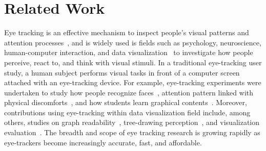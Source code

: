 \section{Related Work}
Eye tracking is an effective mechanism to inspect people's visual patterns and attention processes~\cite{jacob1991use}, and is widely used is fields such as psychology, neuroscience, human-computer interaction, and data visualization~\cite{duchowski2002breadth} to investigate how people perceive, react to, and think with visual stimuli. In a traditional eye-tracking user study, a human subject performs visual tasks in front of a computer screen attached with an eye-tracking device. For example, eye-tracking experiments were undertaken to study how people recognize faces~\cite{guo2014perceiving}, attention pattern linked with physical discomforts~\cite{vervoort2013attentional}, and how students learn graphical contents~\cite{mayer2010unique}. Moreover, contributions using eye-tracking within data visualization field include, among others, studies on graph readability~\cite{pohl2009comparing, huang2008beyond, huang2005people}, tree-drawing perception~\cite{burch2011evaluation, burch2013visual}, and visualization evaluation~\cite{kim2012does}.  The breadth and scope of eye tracking research is growing rapidly as eye-trackers become increasingly accurate, fast, and affordable.  

